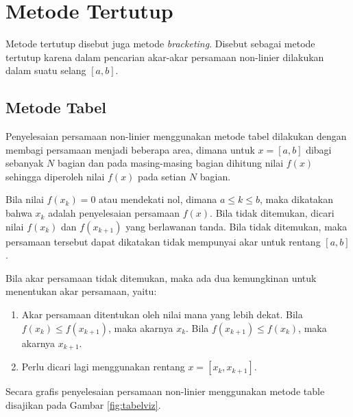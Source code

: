 \documentclass[]{book}
\providecommand{\tightlist}{%
  \setlength{\itemsep}{0pt}\setlength{\parskip}{0pt}}
\theoremstyle{definition}
\theoremstyle{definition}
\theoremstyle{definition}
\theoremstyle{remark}
\begin{document}
\hypertarget{bracketing}{%
\section{Metode Tertutup}\label{bracketing}}

Metode tertutup disebut juga metode \emph{bracketing}. Disebut sebagai metode tertutup karena dalam pencarian akar-akar persamaan non-linier dilakukan dalam suatu selang \(\left[a,b \right]\).

\hypertarget{table}{%
\subsection{Metode Tabel}\label{table}}

Penyelesaian persamaan non-linier menggunakan metode tabel dilakukan dengan membagi persamaan menjadi beberapa area, dimana untuk \(x=\left[a,b \right]\) dibagi sebanyak \(N\) bagian dan pada masing-masing bagian dihitung nilai \(f\left(x \right)\) sehingga diperoleh nilai \(f\left(x \right)\) pada setian \(N\) bagian.

Bila nilai \(f\left(x_k \right)=0\) atau mendekati nol, dimana \(a \le k \le b\), maka dikatakan bahwa \(x_k\) adalah penyelesaian persamaan \(f\left(x \right)\). Bila tidak ditemukan, dicari nilai \(f\left(x_k \right)\) dan \(f\left(x_{k+1} \right)\) yang berlawanan tanda. Bila tidak ditemukan, maka persamaan tersebut dapat dikatakan tidak mempunyai akar untuk rentang \(\left[a,b \right]\).

Bila akar persamaan tidak ditemukan, maka ada dua kemungkinan untuk menentukan akar persamaan, yaitu:

\begin{enumerate}
\def\labelenumi{\alph{enumi}.}
\tightlist
\item
  Akar persamaan ditentukan oleh nilai mana yang lebih dekat. Bila \(f\left(x_k\right)\le f\left(x_{k+1}\right)\), maka akarnya \(x_k\). Bila \(f\left(x_{k+1}\right)\le f\left(x_{k}\right)\), maka akarnya \(x_{k+1}\).
\item
  Perlu dicari lagi menggunakan rentang \(x=\left[x_{k}, x_{k+1} \right]\).
\end{enumerate}

Secara grafis penyelesaian persamaan non-linier menggunakan metode table disajikan pada Gambar \ref{fig:tabelviz}.
\end{document}
